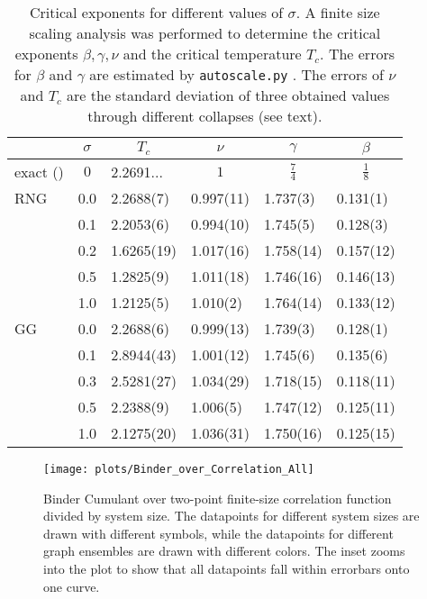 \begin{table}[htbp]
    \center
    \begin{tabular}{l l l l l l}
        \toprule
         & \multicolumn{1}{c}{\(\sigma\)} & \multicolumn{1}{c}{\(T_c\)} & \multicolumn{1}{c}{\(\nu\)} & \multicolumn{1}{c}{\(\gamma\)} & \multicolumn{1}{c}{\(\beta\)}\\
        \midrule
        exact (\cite[p. 59]{Pelissetto2002}) & \multicolumn{1}{c}{\(0\)} & 2.2691... & \multicolumn{1}{c}{\(1\)} & \multicolumn{1}{c}{\(\frac{7}{4}\)} & \multicolumn{1}{c}{\(\frac{1}{8}\)}\\
        \midrule
        RNG          & 0.0 & 2.2688(7) & 0.997(11)& 1.737(3) & 0.131(1) \\
                     & 0.1 & 2.2053(6) & 0.994(10)& 1.745(5) & 0.128(3) \\
                     & 0.2 & 1.6265(19)& 1.017(16)& 1.758(14)& 0.157(12)\\
                     & 0.5 & 1.2825(9) & 1.011(18)& 1.746(16)& 0.146(13)\\
                     & 1.0 & 1.2125(5) & 1.010(2) & 1.764(14)& 0.133(12)\\
        \midrule
        GG           & 0.0 & 2.2688(6) & 0.999(13)& 1.739(3) & 0.128(1)\\
                     & 0.1 & 2.8944(43)& 1.001(12)& 1.745(6) & 0.135(6) \\
                     & 0.3 & 2.5281(27)& 1.034(29)& 1.718(15)& 0.118(11)\\
                     & 0.5 & 2.2388(9) & 1.006(5) & 1.747(12)& 0.125(11)\\
                     & 1.0 & 2.1275(20)& 1.036(31)& 1.750(16)& 0.125(15)\\

        \bottomrule
    \end{tabular}
    \caption[Critical Exponents for Different $\sigma$]{
        Critical exponents for different values of \(\sigma\). A finite size
        scaling analysis was performed to determine the critical
        exponents \(\beta, \gamma, \nu\) and the critical temperature
        \(T_c\). The errors for \(\beta\) and \(\gamma\) are estimated
        by \texttt{autoscale.py} \cite{autoscale2009}. The errors of
        \(\nu\) and \(T_c\) are the standard deviation of three obtained
        values through different collapses (see text).
    }
    \label{tab:critExp}
\end{table}

\begin{figure}[hbtp]
    \centering
    \texttt{[image: plots/Binder\_over\_Correlation\_All]}
    \caption[Binder Cumulant over two-point finite-size correlation function divided by system size]
    {
        Binder Cumulant over two-point finite-size correlation function
        divided by system size. The datapoints for different system sizes
        are drawn with different symbols, while the datapoints for different
        graph ensembles are drawn with different colors.
        The inset zooms into the plot to show that
        all datapoints fall within errorbars onto one curve.
    }
    \label{fig:binderOverCorr}
\end{figure}

